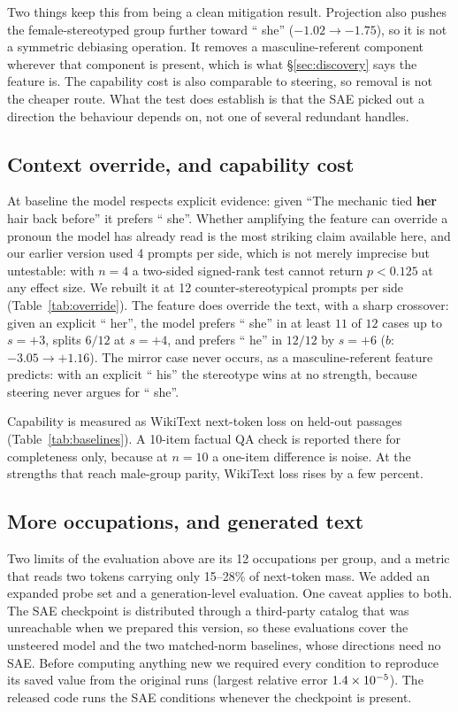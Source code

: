 \documentclass{article}
\begin{document}
Two things keep this from being a clean mitigation result. Projection also pushes the
female-stereotyped group further toward `` she'' ($-1.02 \to -1.75$), so it is not a
symmetric debiasing operation. It removes a masculine-referent component wherever that
component is present, which is what \S\ref{sec:discovery} says the feature is. The
capability cost is also comparable to steering, so removal is not the cheaper route. What
the test does establish is that the SAE picked out a direction the behaviour depends on,
not one of several redundant handles.

\subsection{Context override, and capability cost}
\label{sec:override}

At baseline the model respects explicit evidence: given ``The mechanic tied \textbf{her}
hair back before'' it prefers `` she''. Whether amplifying the feature can override a
pronoun the model has already read is the most striking claim available here, and our
earlier version used 4 prompts per side, which is not merely imprecise but untestable:
with $n=4$ a two-sided signed-rank test cannot return $p<0.125$ at any effect size. We rebuilt it at 12
counter-stereotypical prompts per side (Table~\ref{tab:override}). The feature does override
the text, with a sharp crossover: given an explicit `` her'', the model prefers `` she'' in
at least $11$ of $12$ cases up to $s=+3$, splits $6/12$ at $s=+4$, and prefers `` he'' in
$12/12$ by $s=+6$ ($b$: $-3.05 \to +1.16$). The mirror case never occurs, as a masculine-referent
feature predicts: with an explicit `` his'' the stereotype wins at no strength, because
steering never argues for `` she''.

Capability is measured as WikiText next-token loss on held-out passages
(Table~\ref{tab:baselines}). A 10-item factual QA check is reported there for completeness
only, because at $n=10$ a one-item difference is noise. At the strengths that reach
male-group parity, WikiText loss rises by a few percent.

\subsection{More occupations, and generated text}
\label{sec:beyond}

Two limits of the evaluation above are its 12 occupations per group, and a metric that
reads two tokens carrying only 15--28\% of next-token mass. We added an expanded
probe set and a generation-level evaluation. One caveat applies to both. The SAE checkpoint
is distributed through a third-party catalog that was unreachable when we prepared this
version, so these evaluations cover the unsteered model and the two matched-norm baselines,
whose directions need no SAE. Before computing anything new we required every condition to
reproduce its saved value from the original runs (largest relative error
$1.4\times10^{-5}$). The released code runs the SAE conditions whenever the checkpoint is
present.
\end{document}
